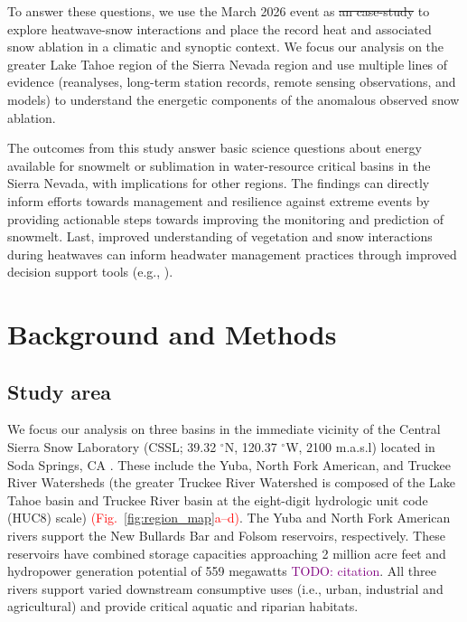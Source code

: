 \documentclass[draft]{agujournal2019}
\newcommand{\fig}[2]{\textcolor{red}{(Fig.~\ref{#1}{#2})}}   %
\newcommand{\todo}[1]{\textcolor{purple}{TODO: #1}}      %
\providecommand{\DIFadd}[1]{{\protect\color{blue}\uwave{#1}}} %
\providecommand{\DIFdel}[1]{{\protect\color{red}\sout{#1}}}                      %
\providecommand{\DIFaddbegin}{} %
\providecommand{\DIFaddend}{} %
\providecommand{\DIFdelbegin}{} %
\providecommand{\DIFdelend}{} %
\begin{document}
To answer these questions, we use the March 2026 event as \DIFdelbegin \DIFdel{an case-study }\DIFdelend \DIFaddbegin \DIFadd{a case study }\DIFaddend to explore heatwave-snow interactions and place the record heat and associated snow ablation in a climatic and synoptic context.
We focus our analysis on the greater Lake Tahoe region of the Sierra Nevada region and use multiple lines of evidence (reanalyses, long-term station records, remote sensing observations, and models) to understand the energetic components of the anomalous observed snow ablation.

The outcomes from this study answer basic science questions about energy available for snowmelt or sublimation in water-resource critical basins in the Sierra Nevada, with implications for other regions.
The findings can directly inform efforts towards management and resilience against extreme events by providing actionable steps towards improving the monitoring and prediction of snowmelt.
Last, improved understanding of vegetation and snow interactions during heatwaves can inform headwater management practices through improved decision support tools (e.g., ).


\section{Background and Methods}
\subsection{Study area}
We focus our analysis on three basins in the immediate vicinity of the Central Sierra Snow Laboratory (CSSL; 39.32 $^\circ$N, 120.37 $^\circ$W, 2100 m.a.s.l) located in Soda Springs, CA  \cite{Schwartz_Cowherd_McGurk_Mason_Riker-Coleman_Zutter_Lewis_2026}.
These include the Yuba, North Fork American, and Truckee River Watersheds (the greater Truckee River Watershed is composed of the Lake Tahoe basin and Truckee River basin at the eight-digit hydrologic unit code (HUC8) scale) \fig{fig:region_map}{a--d}.
The Yuba and North Fork American rivers support the New Bullards Bar and Folsom reservoirs, respectively.
These reservoirs have combined storage capacities approaching 2 million acre feet and hydropower generation potential of 559 megawatts \todo{citation}.
All three rivers support varied downstream consumptive uses (i.e., urban, industrial and agricultural) and provide critical aquatic and riparian habitats.
\end{document}
